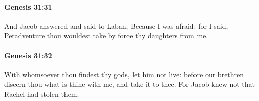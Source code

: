 		\paragraph{Genesis 31:31} %
			\label{GENESIS-31-31}

			And Jacob answered and said to Laban, Because I was afraid: for I said, Peradventure thou wouldest take by force thy daughters from me.


		\paragraph{Genesis 31:32} %
			\label{GENESIS-31-32}

			With whomsoever thou findest thy gods, let him not live: before our brethren discern thou what is thine with me, and take it to thee. For Jacob knew not that Rachel had stolen them.


